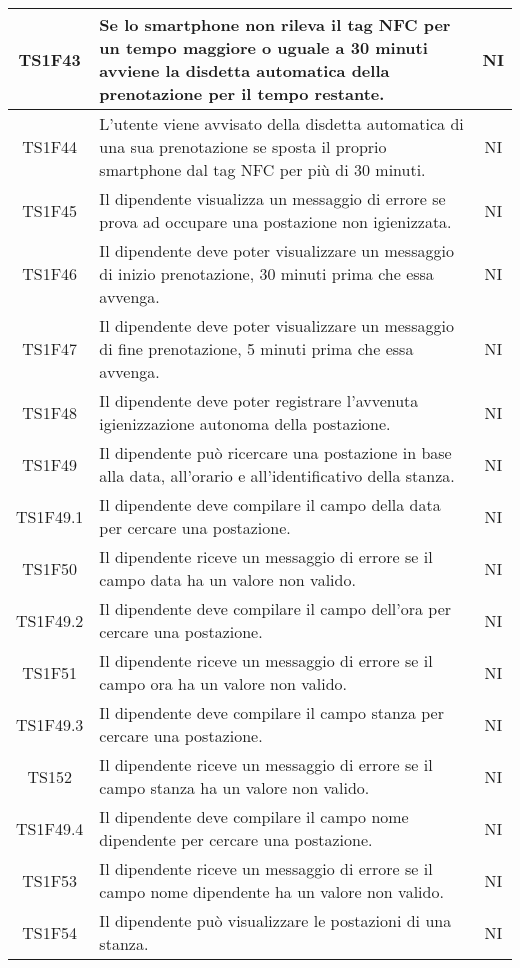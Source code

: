 \begin{center}
\begin{longtable}{|c|p{10cm}|c|}
			\hline					
			TS1F43 & Se lo smartphone non rileva il tag NFC per un tempo maggiore o uguale a 30 minuti avviene la disdetta automatica della prenotazione per il tempo restante. & NI \\	
			\hline				
			TS1F44 & L’utente viene avvisato della disdetta automatica di una sua prenotazione se sposta il proprio smartphone dal tag NFC per più di 30 minuti. & NI \\	
			\hline				
			TS1F45 & Il dipendente visualizza un messaggio di errore se prova ad occupare una postazione non igienizzata. & NI \\	
			\hline
			TS1F46 & Il dipendente deve poter visualizzare un messaggio di inizio prenotazione, 30 minuti prima che essa avvenga. & NI \\	
			\hline
			TS1F47 & Il dipendente deve poter visualizzare un messaggio di fine prenotazione, 5 minuti prima che essa avvenga. & NI \\	
			\hline
			TS1F48 & Il dipendente deve poter registrare l'avvenuta igienizzazione autonoma della postazione. & NI \\	
			\hline
			TS1F49 & Il dipendente può ricercare una postazione in base alla data, all'orario e all'identificativo della stanza. & NI \\	
			\hline
			TS1F49.1 & Il dipendente deve compilare il campo della data per cercare una postazione. & NI \\	
			\hline
			TS1F50 & Il dipendente riceve un messaggio di errore se il campo data ha un valore non valido. & NI \\	
			\hline
			TS1F49.2 & Il dipendente deve compilare il campo dell'ora per cercare una postazione. & NI \\	
			\hline
			TS1F51 & Il dipendente riceve un messaggio di errore se il campo ora ha un valore non valido. & NI \\	
			\hline			
			TS1F49.3 & Il dipendente deve compilare il campo stanza per cercare una postazione. & NI \\	
			\hline
			TS152 & Il dipendente riceve un messaggio di errore se il campo stanza ha un valore non valido. & NI \\	
			\hline			
			TS1F49.4 & Il dipendente deve compilare il campo nome dipendente per cercare una postazione. & NI \\	
			\hline
			TS1F53 & Il dipendente riceve un messaggio di errore se il campo nome dipendente ha un valore non valido. & NI \\	
			\hline
			TS1F54 & Il dipendente può visualizzare le postazioni di una stanza. & NI \\	

\end{longtable}
\end{center}

